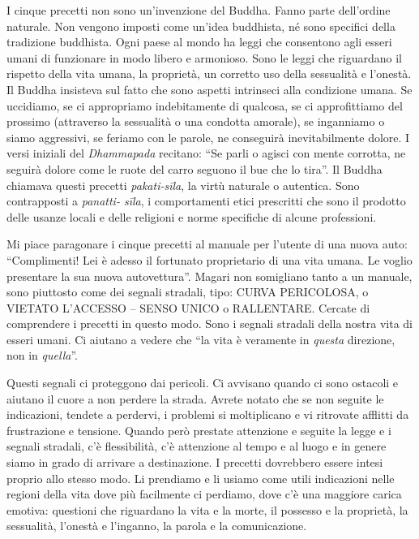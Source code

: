 \vspace*{-0.8em}
I cinque precetti non sono un'invenzione del Buddha. Fanno parte dell'ordine naturale. Non vengono imposti come un'idea buddhista, né sono specifici della tradizione buddhista. Ogni paese al mondo ha leggi che consentono agli esseri umani di funzionare in modo libero e armonioso. Sono le leggi che riguardano il rispetto della vita umana, la proprietà, un corretto uso della sessualità e l'onestà. Il Buddha insisteva sul fatto che sono aspetti intrinseci alla condizione umana. Se uccidiamo, se ci appropriamo indebitamente di qualcosa, se ci approfittiamo del prossimo (attraverso la sessualità o una condotta amorale), se inganniamo o siamo aggressivi, se feriamo con le parole, ne conseguirà inevitabilmente dolore. I versi iniziali del \textit{Dhammapada }recitano: ``Se parli o agisci con mente corrotta, ne seguirà dolore come le ruote del carro seguono il bue che lo tira''. Il Buddha chiamava questi precetti \textit{pakati-sīla}, la virtù naturale o autentica. Sono contrapposti a \textit{panatti- sīla}, i comportamenti etici prescritti che sono il prodotto delle usanze locali e delle religioni e norme specifiche di alcune professioni.

Mi piace paragonare i cinque precetti al manuale per l'utente di una nuova auto: ``Complimenti! Lei è adesso il fortunato proprietario di una vita umana. Le voglio presentare la sua nuova autovettura''. Magari non somigliano tanto a un manuale, sono piuttosto come dei segnali stradali, tipo: CURVA PERICOLOSA, o VIETATO L'ACCESSO – SENSO UNICO o RALLENTARE. Cercate di comprendere i precetti in questo modo. Sono i segnali stradali della nostra vita di esseri umani. Ci aiutano a vedere che ``la vita è veramente in \textit{questa} direzione, non in \textit{quella}''. 

Questi segnali ci proteggono dai pericoli. Ci avvisano quando ci sono ostacoli e aiutano il cuore a non perdere la strada. Avrete notato che se non seguite le indicazioni, tendete a perdervi, i problemi si moltiplicano e vi ritrovate afflitti da frustrazione e tensione. Quando però prestate attenzione e seguite la legge e i segnali stradali, c'è flessibilità, c'è attenzione al tempo e al luogo e in genere siamo in grado di arrivare a destinazione. I precetti dovrebbero essere intesi proprio allo stesso modo. Li prendiamo e li usiamo come utili indicazioni nelle regioni della vita dove più facilmente ci perdiamo, dove c'è una maggiore carica emotiva: questioni che riguardano la vita e la morte, il possesso e la proprietà, la sessualità, l'onestà e l'inganno, la parola e la comunicazione. 

